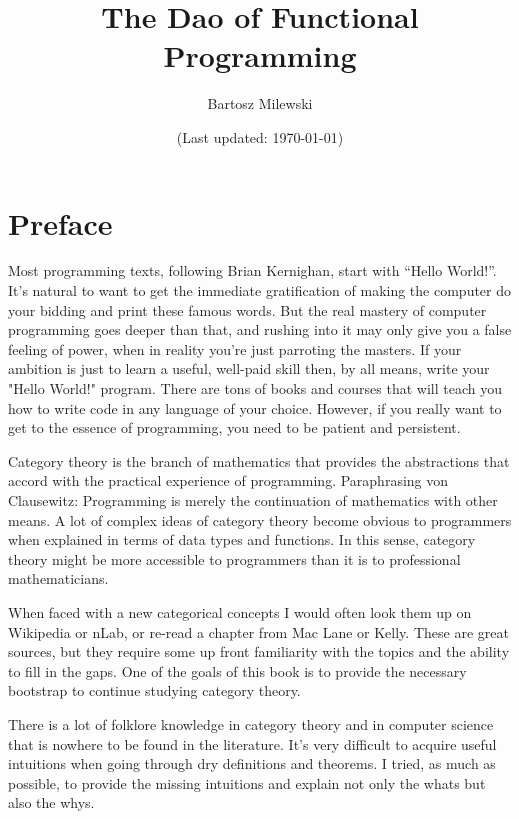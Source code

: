\documentclass[11pt, book]{memoir}
\begin{document}
\setcounter{tocdepth}{4}
\setcounter{secnumdepth}{4}
\frontmatter

\title{\huge The Dao of Functional Programming}
\author{\Large Bartosz Milewski }

\date{\vfill (Last updated: \today)}

\maketitle

\tableofcontents*

\clearpage

\section{Preface}

Most programming texts, following Brian Kernighan, start with ``Hello World!''. It's natural to want to get the immediate gratification of making the computer do your bidding and print these famous words. But the real mastery of computer programming goes deeper than that, and rushing into it may only give you a false feeling of power, when in reality you're just parroting the masters. If your ambition is just to learn a useful, well-paid skill then, by all means, write your "Hello World!" program. There are tons of books and courses that will teach you how to write code in any language of your choice. However, if you really want to get to the essence of programming, you need to be patient and persistent.

Category theory is the branch of mathematics that provides the abstractions that accord with the practical experience of programming. Paraphrasing von Clausewitz: Programming is merely the continuation of mathematics with other means. A lot of complex ideas of category theory become obvious to programmers when explained in terms of data types and functions. In this sense, category theory might be more accessible to programmers than it is to professional mathematicians.

When faced with a new categorical concepts I would often look them up on Wikipedia or nLab, or re-read a chapter from Mac Lane or Kelly. These are great sources, but they require some up front familiarity with the topics and the ability to fill in the gaps. One of the goals of this book is to provide the necessary bootstrap to continue studying category theory.

There is a lot of folklore knowledge in category theory and in computer science that is nowhere to be found in the literature. It's very difficult to acquire useful intuitions when going through dry definitions and theorems. I tried, as much as possible, to provide the missing intuitions and explain not only the whats but also the whys.
\end{document}
